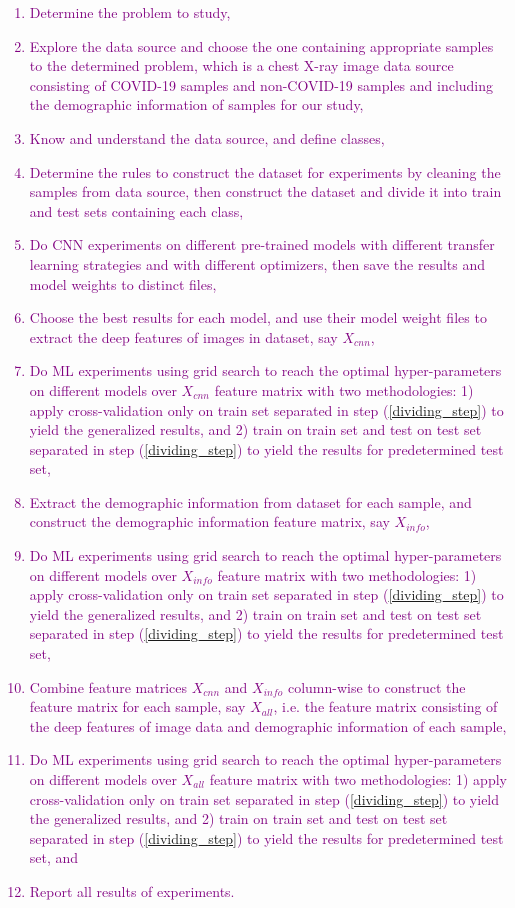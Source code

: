\textcolor{purple}{
	\begin{enumerate}
		\item Determine the problem to study,
		\item Explore the data source and choose the one containing appropriate samples to the determined problem, which is a chest X-ray image data source consisting of COVID-19 samples and non-COVID-19 samples and including the demographic information of samples for our study,
		\item Know and understand the data source, and define classes,
		\item Determine the rules to construct the dataset for experiments by cleaning the samples from data source, then construct the dataset and divide it into train and test sets containing each class, \label{dividing_step}
		\item Do CNN experiments on different pre-trained models with different transfer learning strategies and with different optimizers, then save the results and model weights to distinct files,
		\item Choose the best results for each model, and use their model weight files to extract the deep features of images in dataset, say $X_{cnn}$,
		\item Do ML experiments using grid search to reach the optimal hyper-parameters on different models over $X_{cnn}$ feature matrix with two methodologies: 1) apply cross-validation only on train set separated in step (\ref{dividing_step}) to yield the generalized results, and 2) train on train set and test on test set separated in step (\ref{dividing_step}) to yield the results for predetermined test set, \label{ML_experiment_step}
		\item Extract the demographic information from dataset for each sample, and construct the demographic information feature matrix, say $X_{info}$,
		\item Do ML experiments using grid search to reach the optimal hyper-parameters on different models over $X_{info}$ feature matrix with two methodologies: 1) apply cross-validation only on train set separated in step (\ref{dividing_step}) to yield the generalized results, and 2) train on train set and test on test set separated in step (\ref{dividing_step}) to yield the results for predetermined test set,
		\item Combine feature matrices $X_{cnn}$ and $X_{info}$ column-wise to construct the feature matrix for each sample, say $X_{all}$, i.e. the feature matrix consisting of the deep features of image data and demographic information of each sample,
		\item Do ML experiments using grid search to reach the optimal hyper-parameters on different models over $X_{all}$ feature matrix with two methodologies: 1) apply cross-validation only on train set separated in step (\ref{dividing_step}) to yield the generalized results, and 2) train on train set and test on test set separated in step (\ref{dividing_step}) to yield the results for predetermined test set, and
		\item Report all results of experiments.
	\end{enumerate}
}

